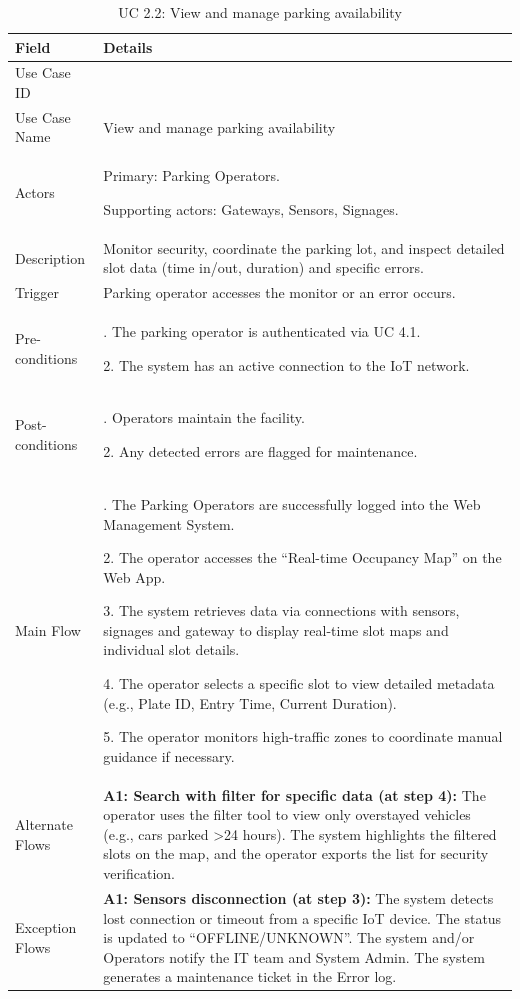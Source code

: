 \begin{table}[H]
\small
\renewcommand{\arraystretch}{1.4}
\begin{tabularx}{\textwidth}{|>{\raggedright\arraybackslash}p{3.5cm}|>{\RaggedRight\arraybackslash}X|}
\hline
\rowcolor{gray!20} \textbf{Field} & \textbf{Details} \\
\hline
Use Case ID & 2.2 \\
\hline
Use Case Name & View and manage parking availability \\
\hline
Actors & Primary: Parking Operators. \par Supporting actors: Gateways, Sensors, Signages. \\
\hline
Description & Monitor security, coordinate the parking lot, and inspect detailed slot data (time in/out, duration) and specific errors. \\
\hline
Trigger & Parking operator accesses the monitor or an error occurs. \\
\hline
Pre-conditions & 1. The parking operator is authenticated via UC 4.1. \par 2. The system has an active connection to the IoT network. \\
\hline
Post-conditions & 1. Operators maintain the facility. \par 2. Any detected errors are flagged for maintenance. \\
\hline
Main Flow & 
1. The Parking Operators are successfully logged into the Web Management System. \par
2. The operator accesses the ``Real-time Occupancy Map'' on the Web App. \par
3. The system retrieves data via connections with sensors, signages and gateway to display real-time slot maps and individual slot details. \par
4. The operator selects a specific slot to view detailed metadata (e.g., Plate ID, Entry Time, Current Duration). \par
5. The operator monitors high-traffic zones to coordinate manual guidance if necessary. \\
\hline
Alternate Flows & 
\textbf{A1: Search with filter for specific data (at step 4):} The operator uses the filter tool to view only overstayed vehicles (e.g., cars parked >24 hours). The system highlights the filtered slots on the map, and the operator exports the list for security verification. \\
\hline
Exception Flows & 
\textbf{A1: Sensors disconnection (at step 3):} The system detects lost connection or timeout from a specific IoT device. The status is updated to ``OFFLINE/UNKNOWN''. The system and/or Operators notify the IT team and System Admin. The system generates a maintenance ticket in the Error log. \\
\hline
\end{tabularx}
\caption{UC 2.2: View and manage parking availability}
\label{tab:uc2.2}
\end{table}